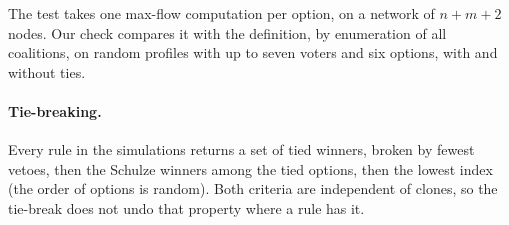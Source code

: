The test takes one max-flow computation per option, on a network of $n + m + 2$ nodes. Our check compares
it with the definition, by enumeration of all coalitions, on random profiles with up to seven voters and
six options, with and without ties.

\paragraph{Tie-breaking.} Every rule in the simulations returns a set of tied winners, broken by fewest
vetoes, then the Schulze winners among the tied options, then the lowest index (the order of options is
random). Both criteria are independent of clones, so the tie-break does not undo that property where a
rule has it.
